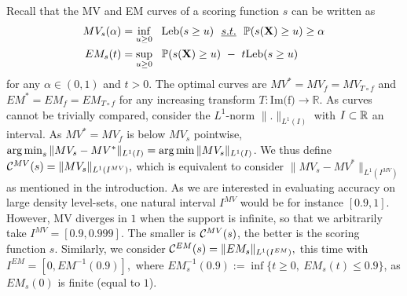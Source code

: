 Recall that the MV and EM curves of a scoring function $s$ can be written as
\noindent
\begin{align}
\label{resume_fr:intro:MV-def}
 MV_s(\alpha) &= \inf_{u \ge 0}~~ \text{Leb}(s \ge u) ~~\emph{s.t.}{}~~\mathbb{P}(s(\mathbf X) \ge u) \ge \alpha\\
\label{resume_fr:intro:EM-def}
 EM_s(t) &= \sup_{u \ge 0}~~ \mathbb{P}(s(\mathbf X) \ge u) ~-~ t \text{Leb}(s \ge u)
\end{align}
for any $\alpha\in (0,1)$ and $t >0$.
%
The optimal curves are $MV^* = MV_f = MV_{T \circ f}$ and $EM^* = EM_f = EM_{T \circ f}$ for any increasing transform $T: \text{Im(f)} \to \mathbb{R}$.
%
As curves cannot be trivially compared, consider the $L^1$-norm $\|.\|_{L^1(I)}$ with $I\subset \mathbb{R}$ an interval. As $MV^*=MV_f$ is below $MV_s$ pointwise, $\argmin_s \| MV_s - MV^* \|_{L^1(I)} = \argmin \| MV_s \|_{L^1(I)} $. We thus define
$\mathcal{C}^{MV}(s) = \| MV_s \|_{L^1(I^{MV})},$ which is equivalent to consider $\| MV_s - MV^* \|_{L^1(I^{MV})}$ as mentioned in the introduction. As we are interested in evaluating accuracy on large density level-sets, one natural interval $I^{MV}$ would be for instance $[0.9, 1]$. However, MV diverges in $1$ when the support is infinite, so that we arbitrarily take $I^{MV} = [0.9, 0.999].$
The smaller is $\mathcal{C}^{MV}(s)$, the better is the scoring function $s$.
%
Similarly, we consider $\mathcal{C}^{EM}(s) = \| EM_s \|_{L^1(I^{EM})}, $ this time with $I^{EM} = [0,EM^{-1}(0.9)],$ where $EM_s^{-1}(0.9) := \inf\{t\ge 0,~ EM_s(t) \le 0.9\}$, as $EM_s(0)$ is finite (equal to $1$). %

